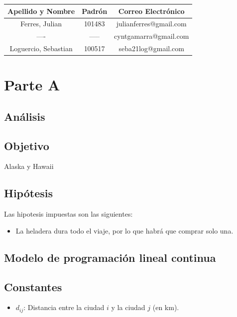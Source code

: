 \documentclass[a4paper]{article}
\begin{document}
\begin{center}
\begin{tabular}{|c|c|c|}
	\hline
	\textbf{Apellido y Nombre} & \textbf{Padrón} & \textbf{Correo Electrónico}  \\

    \hline
     Ferres, Julian &101483 & julianferres@gmail.com \\
    \hline
    ---- & ----- & cyntgamarra@gmail.com\\
	\hline
    Loguercio, Sebastian & 100517 & seba21log@gmail.com  \\
    \hline


 \end{tabular}
\end{center}

\newpage
\tableofcontents
\thispagestyle{empty}


\newpage
\setcounter{page}{1}

\section{Parte A}

\subsection{Análisis}

\subsection{Objetivo}
Alaska y Hawaii
\subsection{Hipótesis}
Las hipotesis impuestas son las siguientes:

\begin{itemize}
	\item La heladera dura todo el viaje, por lo que habrá que comprar solo una.
\end{itemize}


\subsection{Modelo de programación lineal continua}
\subsection{Constantes}

\begin{itemize}
	\item $d_{ij}$: Distancia entre la ciudad $i$ y la ciudad $j$ (en km).


\end{itemize}
\end{document}
